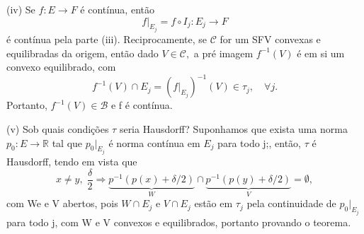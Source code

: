 \documentclass[../distribution_theory_notes.tex]{subfiles}
\begin{document}
\begin{proof*}
	(iv) Se \(f:E\rightarrow F\) é contínua, então
	\[
		f|_{E_{j}}=f\circ I_{j}:E_{j}\rightarrow F
	\]
	é contínua pela parte (iii). Reciprocamente, se \(\mathcal{C}\) for um SFV convexas e equilibradas da origem, então dado \(V\in \mathcal{C},\) a pré imagem \(f^{-1}(V)\) é em si um convexo equilibrado, com
	\[
		f^{-1}(V)\cap E_{j} = (f|_{E_{j}})^{-1}(V)\in \tau_{j},\quad \forall j.
	\]
	Portanto, \(f^{-1}(V)\in \mathcal{B}\) e f é contínua. \qedsymbol

	(v) Sob quais condições \(\tau \) seria Hausdorff? Suponhamos que exista uma norma \(p_{0}:E\rightarrow \mathbb{R}\) tal que \(p_{0}|_{E_{j}}\) é norma contínua em \(E_{j}\) para todo j;, então, \(\tau \) é Hausdorff, tendo em vista que
	\[
		x\neq y,\; \frac{\delta }{2} \Rightarrow \underbrace{p^{-1}(p(x)+\delta/2)}_{W}\cap \underbrace{p^{-1}(p(y)+\delta/2)}_{V} = \emptyset,
	\]
	com We e V abertos, pois \(W\cap E_{j}\) e \(V\cap E_{j}\) estão em \(\tau_{j}\) pela continuidade de \(p_{0}|_{E_{j}}\) para todo j, com W e V convexos e equilibrados, portanto provando o teorema. \qedsymbol
\end{proof*}
\end{document}

